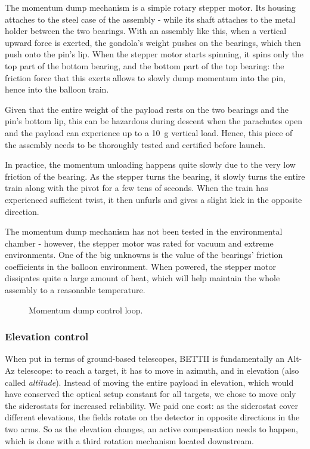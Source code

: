 The momentum dump mechanism is a simple rotary stepper motor. Its housing attaches to the steel case of the assembly - while its shaft attaches to the metal holder between the two bearings. With an assembly like this, when a vertical upward force is exerted, the gondola's weight pushes on the bearings, which then push onto the pin's lip. When the stepper motor starts spinning, it spins only the top part of the bottom bearing, and the bottom part of the top bearing: the friction force that this exerts allows to slowly dump momentum into the pin, hence into the balloon train. 

Given that the entire weight of the payload rests on the two bearings and the pin's bottom lip, this can be hazardous during descent when the parachutes open and the payload can experience up to a 10~g vertical load. Hence, this piece of the assembly needs to be thoroughly tested and certified before launch. 

In practice, the momentum unloading happens quite slowly due to the very low friction of the bearing. As the stepper turns the bearing, it slowly turns the entire train along with the pivot for a few tens of seconds. When the train has experienced sufficient twist, it then unfurls and gives a slight kick in the opposite direction. 

The momentum dump mechanism has not been tested in the environmental chamber - however, the stepper motor was rated for vacuum and extreme environments. One of the big unknowns is the value of the bearings' friction coefficients in the balloon environment. When powered, the stepper motor dissipates quite a large amount of heat, which will help maintain the whole assembly to a reasonable temperature. 

\begin{figure}[!h]
	\centering
	
	\caption[Momentum dump PID]{Momentum dump control loop.}
	\label{fig:MomDumpPID}
    \end{figure}



\subsubsection{Elevation control}

When put in terms of ground-based telescopes, BETTII is fundamentally an Alt-Az telescope: to reach a target, it has to move in azimuth, and in elevation (also called \textit{altitude}). Instead of moving the entire payload in elevation, which would have conserved the optical setup constant for all targets, we chose to move only the siderostats for increased reliability. We paid one cost: as the siderostat cover different elevations, the fields rotate on the detector in opposite directions in the two arms. So as the elevation changes, an active compensation needs to happen, which is done with a third rotation mechanism located downstream.

